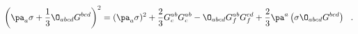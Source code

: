 \begin{equation}
\left(\pa_a\sigma + {1\over 3}\O_{abcd}G^{bcd}\right)^2 =
(\pa_a\sigma)^2 + {2\over 3}G^{ab}_c G^{ab}_c - 
\O_{abcd}G^{ab}_f G^{cd}_f + 
{2\over 3}\pa^a\left(\sigma\O_{abcd}G^{bcd}\right) \ \ .
\label{sigma^2}
\end{equation}

